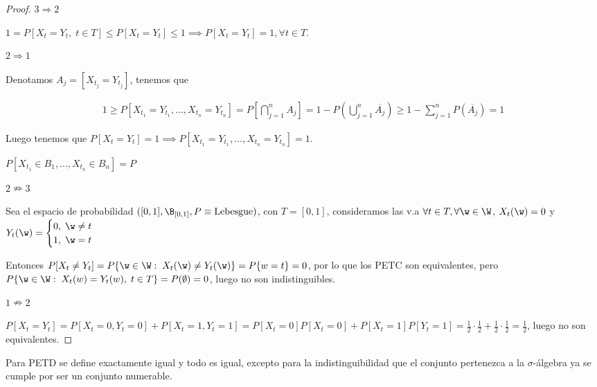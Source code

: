 \begin{proof}

$\boxed{3 \Rightarrow 2}$

$1 = P[X_t = Y_t, \; t \in T] \leq P[X_t = Y_t] \leq 1 \implies P[X_t = Y_t] = 1, \forall t \in T$.



$\boxed{2 \Rightarrow 1}$


Denotamos $A_j = [X_{t_j} = Y_{t_j}]$, tenemos que

\begin{multline*}
  1 \geq P[X_{t_1} = Y_{t_1}, \ldots, X_{t_n} = Y_{t_n}] = P[\bigcap \limits^n_{j = 1} A_j] = 1 - P(\bigcup \limits^n_{j = 1} \overline{A_j}) \geq 1 - \sum \limits^n_{j = 1} P(\overline{A_j}) = 1
\end{multline*}

Luego tenemos que $P[X_t = Y_t] = 1 \implies P[X_{t_1} = Y_{t_1}, \ldots, X_{t_n} = Y_{t_n}] = 1$.

$P[X_{t_1} \in B_1, \ldots, X_{t_n} \in B_n] = P$


$\boxed{2 \nRightarrow 3}$

Sea el espacio de probabilidad $([0, 1], \B_{[0,1]}, P \equiv \text{Lebesgue})$, con $T = [0,1]$, consideramos las v.a $\forall t \in T, \forall \w \in \W$, $X_t(\w) = 0$ y $Y_t(\w) = \begin{cases} 0, \; \w \neq t \\ 1, \; \w = t \end{cases}$

Entonces $P[X_t \neq Y_t] = P\{ \w \in \W : \; X_t(\w) \neq Y_t(\w)\} = P\{w = t\} = 0$, por lo que los PETC son equivalentes, pero $P\{\w \in \W : \; X_t(w) = Y_t(w), \; t \in T\} = P(\emptyset) = 0$, luego no son indistinguibles.

$\boxed{1 \nRightarrow 2}$

$P[X_t = Y_t] = P[X_t = 0, Y_t = 0] + P[X_t = 1, Y_t = 1] = P[X_t = 0]P[X_t = 0] + P[X_t = 1]P[Y_t = 1] = \frac{1}{2} \cdot \frac{1}{2} + \frac{1}{2} \cdot \frac{1}{2} = \frac{1}{2}$, luego no son equivalentes.
\end{proof}

\begin{nota}
  Para PETD se define exactamente igual y todo es igual, excepto para la indistinguibilidad que el conjunto pertenezca a la $\sigma$-álgebra ya se cumple por ser un conjunto numerable.
\end{nota}
